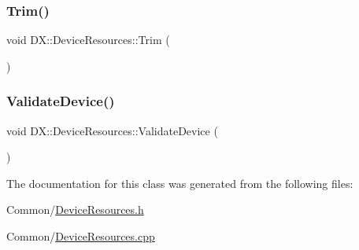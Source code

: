 \mbox{\label{class_d_x_1_1_device_resources_ac8a6eb7a3a4de63e0316382a0c3ac4a4}} 
\subsubsection{\texorpdfstring{Trim()}{Trim()}}
{\footnotesize\ttfamily void D\+X\+::\+Device\+Resources\+::\+Trim (\begin{DoxyParamCaption}{ }\end{DoxyParamCaption})}

\mbox{\label{class_d_x_1_1_device_resources_ab6976bc6f653fab6899b53a4b5308b06}} 
\subsubsection{\texorpdfstring{Validate\+Device()}{ValidateDevice()}}
{\footnotesize\ttfamily void D\+X\+::\+Device\+Resources\+::\+Validate\+Device (\begin{DoxyParamCaption}{ }\end{DoxyParamCaption})}



The documentation for this class was generated from the following files\+:\begin{DoxyCompactItemize}
\item 
Common/\hyperlink{_device_resources_8h}{Device\+Resources.\+h}\item 
Common/\hyperlink{_device_resources_8cpp}{Device\+Resources.\+cpp}\end{DoxyCompactItemize}
